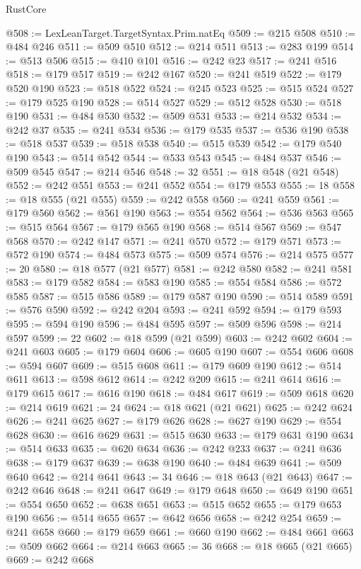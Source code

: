 \begin{lexlean}{RustCore}
\begin{coremodule}
@508 := LexLeanTarget.TargetSyntax.Prim.natEq
@509 := @215 @508
@510 := @484 @246
@511 := @509 @510
@512 := @214 @511
@513 := @283 @199
@514 := @513 @506
@515 := @410 @101
@516 := @242 @23
@517 := @241 @516
@518 := @179 @517
@519 := @242 @167
@520 := @241 @519
@522 := @179 @520 @190
@523 := @518 @522
@524 := @245 @523
@525 := @515 @524
@527 := @179 @525 @190
@528 := @514 @527
@529 := @512 @528
@530 := @518 @190
@531 := @484 @530
@532 := @509 @531
@533 := @214 @532
@534 := @242 @37
@535 := @241 @534
@536 := @179 @535
@537 := @536 @190
@538 := @518 @537
@539 := @518 @538
@540 := @515 @539
@542 := @179 @540 @190
@543 := @514 @542
@544 := @533 @543
@545 := @484 @537
@546 := @509 @545
@547 := @214 @546
@548 := 32
@551 := @18 @548 (@21 @548)
@552 := @242 @551
@553 := @241 @552
@554 := @179 @553
@555 := 18
@558 := @18 @555 (@21 @555)
@559 := @242 @558
@560 := @241 @559
@561 := @179 @560
@562 := @561 @190
@563 := @554 @562
@564 := @536 @563
@565 := @515 @564
@567 := @179 @565 @190
@568 := @514 @567
@569 := @547 @568
@570 := @242 @147
@571 := @241 @570
@572 := @179 @571
@573 := @572 @190
@574 := @484 @573
@575 := @509 @574
@576 := @214 @575
@577 := 20
@580 := @18 @577 (@21 @577)
@581 := @242 @580
@582 := @241 @581
@583 := @179 @582
@584 := @583 @190
@585 := @554 @584
@586 := @572 @585
@587 := @515 @586
@589 := @179 @587 @190
@590 := @514 @589
@591 := @576 @590
@592 := @242 @204
@593 := @241 @592
@594 := @179 @593
@595 := @594 @190
@596 := @484 @595
@597 := @509 @596
@598 := @214 @597
@599 := 22
@602 := @18 @599 (@21 @599)
@603 := @242 @602
@604 := @241 @603
@605 := @179 @604
@606 := @605 @190
@607 := @554 @606
@608 := @594 @607
@609 := @515 @608
@611 := @179 @609 @190
@612 := @514 @611
@613 := @598 @612
@614 := @242 @209
@615 := @241 @614
@616 := @179 @615
@617 := @616 @190
@618 := @484 @617
@619 := @509 @618
@620 := @214 @619
@621 := 24
@624 := @18 @621 (@21 @621)
@625 := @242 @624
@626 := @241 @625
@627 := @179 @626
@628 := @627 @190
@629 := @554 @628
@630 := @616 @629
@631 := @515 @630
@633 := @179 @631 @190
@634 := @514 @633
@635 := @620 @634
@636 := @242 @233
@637 := @241 @636
@638 := @179 @637
@639 := @638 @190
@640 := @484 @639
@641 := @509 @640
@642 := @214 @641
@643 := 34
@646 := @18 @643 (@21 @643)
@647 := @242 @646
@648 := @241 @647
@649 := @179 @648
@650 := @649 @190
@651 := @554 @650
@652 := @638 @651
@653 := @515 @652
@655 := @179 @653 @190
@656 := @514 @655
@657 := @642 @656
@658 := @242 @254
@659 := @241 @658
@660 := @179 @659
@661 := @660 @190
@662 := @484 @661
@663 := @509 @662
@664 := @214 @663
@665 := 36
@668 := @18 @665 (@21 @665)
@669 := @242 @668

\end{coremodule}
\end{lexlean}
